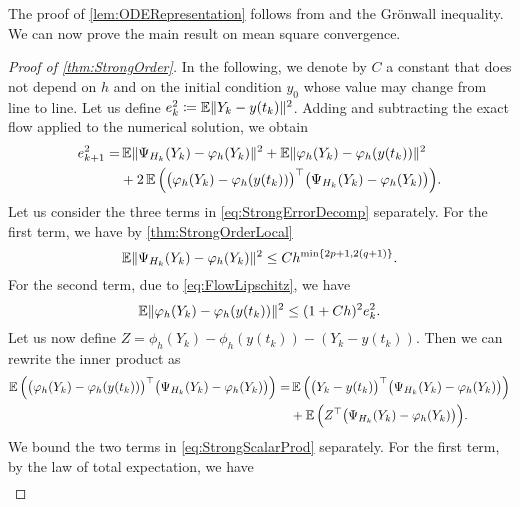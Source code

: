 \documentclass[10pt]{article}
\begin{document}
The proof of \cref{lem:ODERepresentation} follows from  and the Grönwall inequality. We can now prove the main result on mean square convergence.
\begin{proof}[Proof of \cref{thm:StrongOrder}] In the following, we denote by $C$ a constant that does not depend on $h$ and on the initial condition $y_0$ whose value may change from line to line. Let us define $e_k^2 \coloneqq \operatorname{\mathbb{E}}\lVert Y_k - y(t_k)\rVert^2$. Adding and subtracting the exact flow applied to the numerical solution, we obtain
	\begin{equation}\label{eq:StrongErrorDecomp}
		\begin{aligned}
			e_{k+1}^2 = &\operatorname{\mathbb{E}}\lVert\Psi_{H_k}(Y_k) - \varphi_{h}(Y_k)\rVert^2 + \operatorname{\mathbb{E}}\lVert\varphi_{h}(Y_k) - \varphi_{h}(y(t_k))\rVert^2 \\
					  &+ 2\operatorname{\mathbb{E}}\Big(\big(\varphi_{h}(Y_k) - \varphi_{h}(y(t_k))\big)^\top \big(\Psi_{H_k}(Y_k) - \varphi_{h}(Y_k)\big)\Big).
		\end{aligned}
	\end{equation}
	Let us consider the three terms in \eqref{eq:StrongErrorDecomp} separately. For the first term, we have by \cref{thm:StrongOrderLocal}
	\begin{equation}\label{eq:StrongFirstTerm}
		\operatorname{\mathbb{E}}\lVert\Psi_{H_k}(Y_k) - \varphi_{h}(Y_k)\rVert^2 \leq Ch^{\min\{2p+1, 2(q+1)\}}.
	\end{equation}
    For the second term, due to \eqref{eq:FlowLipschitz}, we have
	\begin{equation}\label{eq:StrongSecondTerm}
		\operatorname{\mathbb{E}}\lVert\varphi_{h}(Y_k) - \varphi_{h}(y(t_k))\rVert^2 \leq (1 + Ch)^2 e_k^2.
	\end{equation}
	Let us now define $Z = \phi_{h}(Y_k) - \phi_{h}(y(t_k)) - (Y_k - y(t_k))$. Then we can rewrite the inner product as
	\begin{equation}\label{eq:StrongScalarProd}
	\begin{aligned}
		\operatorname{\mathbb{E}}\Big(\big(\varphi_{h}(Y_k) - \varphi_{h}(y(t_k))\big)^\top \big(\Psi_{H_k}(Y_k) - \varphi_{h}(Y_k)\big)\Big) = &\operatorname{\mathbb{E}}\Big(\big(Y_k - y(t_k)\big)^\top \big(\Psi_{H_k}(Y_k) - \varphi_{h}(Y_k)\big)\Big) \\
		&+ \operatorname{\mathbb{E}}\Big(Z^\top \big(\Psi_{H_k}(Y_k) - \varphi_{h}(Y_k)\big)\Big).
	\end{aligned}
	\end{equation}
	We bound the two terms in \eqref{eq:StrongScalarProd} separately. For the first term, by the law of total expectation, we have
	\begin{equation}
	\begin{aligned}

\end{aligned}
\end{equation}
\end{proof}
\end{document}
